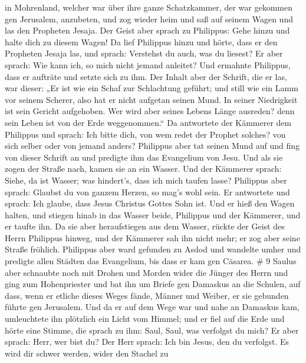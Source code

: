 in Mohrenland, welcher war über ihre ganze Schatzkammer, der war
gekommen gen Jerusalem, anzubeten,  und zog wieder heim und
saß auf seinem Wagen und las den Propheten Jesaja.  Der
Geist aber sprach zu Philippus: Gehe hinzu und halte dich zu diesem
Wagen!  Da lief Philippus hinzu und hörte, dass er den
Propheten Jesaja las, und sprach: Verstehst du auch, was du liesest?
 Er aber sprach: Wie kann ich, so mich nicht jemand
anleitet? Und ermahnte Philippus, dass er aufträte und setzte sich zu
ihm.  Der Inhalt aber der Schrift, die er las, war dieser:
„Er ist wie ein Schaf zur Schlachtung geführt; und still wie ein Lamm
vor seinem Scherer, also hat er nicht aufgetan seinen Mund.
 In seiner Niedrigkeit ist sein Gericht aufgehoben. Wer
wird aber seines Lebens Länge ausreden? denn sein Leben ist von der Erde
weggenommen.``  Da antwortete der Kämmerer dem Philippus
und sprach: Ich bitte dich, von wem redet der Prophet solches? von sich
selber oder von jemand anders?  Philippus aber tat seinen
Mund auf und fing von dieser Schrift an und predigte ihm das Evangelium
von Jesu.  Und als sie zogen der Straße nach, kamen sie an
ein Wasser. Und der Kämmerer sprach: Siehe, da ist Wasser; was
hindert's, dass ich mich taufen lasse?  Philippus aber
sprach: Glaubst du von ganzem Herzen, so mag's wohl sein. Er antwortete
und sprach: Ich glaube, dass Jesus Christus Gottes Sohn ist.
 Und er hieß den Wagen halten, und stiegen hinab in das
Wasser beide, Philippus und der Kämmerer, und er taufte ihn.
 Da sie aber heraufstiegen aus dem Wasser, rückte der Geist
des Herrn Philippus hinweg, und der Kämmerer sah ihn nicht mehr; er zog
aber seine Straße fröhlich.  Philippus aber ward gefunden
zu Asdod und wandelte umher und predigte allen Städten das Evangelium,
bis dass er kam gen Cäsarea. \# 9  Saulus aber schnaubte
noch mit Drohen und Morden wider die Jünger des Herrn und ging zum
Hohenpriester  und bat ihn um Briefe gen Damaskus an die
Schulen, auf dass, wenn er etliche dieses Weges fände, Männer und
Weiber, er sie gebunden führte gen Jerusalem.  Und da er auf
dem Wege war und nahe an Damaskus kam, umleuchtete ihn plötzlich ein
Licht vom Himmel;  und er fiel auf die Erde und hörte eine
Stimme, die sprach zu ihm: Saul, Saul, was verfolgst du mich?
 Er aber sprach: Herr, wer bist du? Der Herr sprach: Ich bin
Jesus, den du verfolgst. Es wird dir schwer werden, wider den Stachel zu
